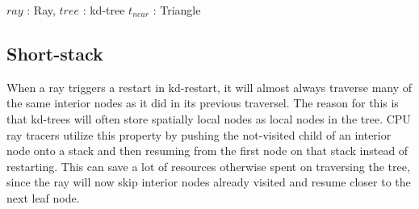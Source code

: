 \begin{algorithm}
  \caption{A kd-restart implementation of ClosestIntersectingTriangle}
  \label{alg:KDRestart}
  \begin{algorithmic}
              {$ray$ : Ray, $tree$ : kd-tree}
              {$t_{near}$ : Triangle}{
                    \ELSE
                    \ENDIF
                  \ENDWHILE
                  \ELSE
                  \ENDIF
                \ENDWHILE
              }
  \end{algorithmic}
\end{algorithm}

\subsection{Short-stack}\label{sec:shortStack}


When a ray triggers a restart in kd-restart, it will almost always traverse many
of the same interior nodes as it did in its previous traversel. The reason for
this is that kd-trees will often store spatially local nodes as local nodes in
the tree. CPU ray tracers utilize this property by pushing the not-visited child
of an interior node onto a stack and then resuming from the first node on that
stack instead of restarting. This can save a lot of resources otherwise spent on
traversing the tree, since the ray will now skip interior nodes already visited
and resume closer to the next leaf node.

